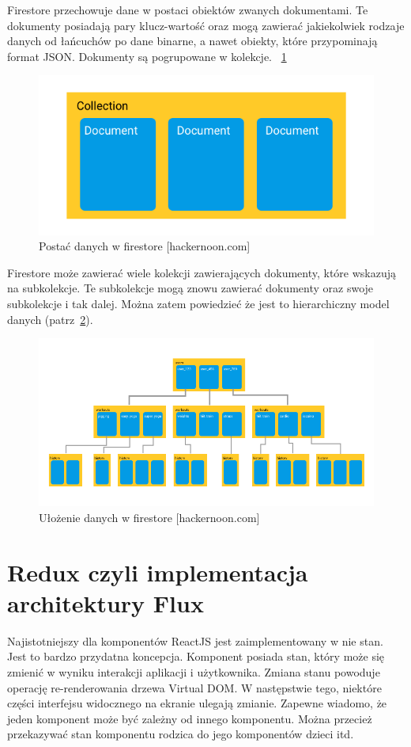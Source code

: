 Firestore przechowuje dane w postaci obiektów zwanych dokumentami.
Te dokumenty posiadają pary klucz-wartość oraz mogą zawierać jakiekolwiek rodzaje danych
od łańcuchów po dane binarne, a nawet obiekty, które przypominają format JSON\@.
Dokumenty są pogrupowane w kolekcje.
~\ref{rys:firestoreData}

\begin{figure}
	\centering\includegraphics[width=.6\textwidth]{img/firestoreData.png}
	\caption{Postać danych w firestore [hackernoon.com]}\label{rys:firestoreData}%
\end{figure}

Firestore może zawierać wiele kolekcji zawierających dokumenty, które wskazują na subkolekcje.
Te subkolekcje mogą znowu zawierać dokumenty oraz swoje subkolekcje i tak dalej.
Można zatem powiedzieć że jest to hierarchiczny model danych (patrz~\ref{rys:firestoreTree}).
~\cite{www_hakermoon}

\begin{figure}
	\centering\includegraphics[width=.6\textwidth]{img/firestoreTree.png}
	\caption{Ułożenie danych w firestore [hackernoon.com]}\label{rys:firestoreTree}%
\end{figure}

\section{Redux czyli implementacja architektury Flux}

Najistotniejszy dla komponentów ReactJS jest zaimplementowany w nie stan.
Jest to bardzo przydatna koncepcja. Komponent posiada stan,
który może się zmienić w wyniku interakcji aplikacji i użytkownika.
Zmiana stanu powoduje operację re-renderowania drzewa Virtual DOM\@.
W następstwie tego, niektóre części interfejsu widocznego na ekranie ulegają zmianie.
Zapewne wiadomo, że jeden komponent może być zależny od innego komponentu. Można przecież przekazywać stan komponentu rodzica do jego komponentów dzieci itd.

